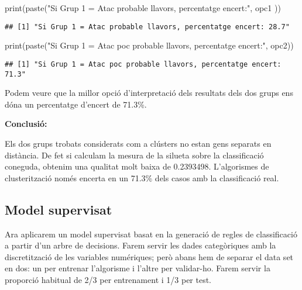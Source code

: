 \documentclass[
]{article}
\newenvironment{Shaded}{\begin{snugshade}}{\end{snugshade}}
\newcommand{\FunctionTok}[1]{\textcolor[rgb]{0.94,0.94,0.56}{#1}}
\newcommand{\NormalTok}[1]{\textcolor[rgb]{0.80,0.80,0.80}{#1}}
\newcommand{\StringTok}[1]{\textcolor[rgb]{0.80,0.58,0.58}{#1}}
\begin{document}
\begin{Shaded}
\begin{Highlighting}[]
\FunctionTok{print}\NormalTok{(}\FunctionTok{paste}\NormalTok{(}\StringTok{"Si Grup 1 = Atac probable llavors, percentatge encert:"}\NormalTok{, opc1 ))}
\end{Highlighting}
\end{Shaded}

\begin{verbatim}
## [1] "Si Grup 1 = Atac probable llavors, percentatge encert: 28.7"
\end{verbatim}

\begin{Shaded}
\begin{Highlighting}[]
\FunctionTok{print}\NormalTok{(}\FunctionTok{paste}\NormalTok{(}\StringTok{"Si Grup 1 = Atac poc probable llavors, percentatge encert:"}\NormalTok{, opc2))}
\end{Highlighting}
\end{Shaded}

\begin{verbatim}
## [1] "Si Grup 1 = Atac poc probable llavors, percentatge encert: 71.3"
\end{verbatim}

Podem veure que la millor opció d'interpretació dels resultats dels dos
grups ens dóna un percentatge d'encert de 71.3\%.

\textbf{Conclusió:}

Els dos grups trobats considerats com a clústers no estan gens separats
en distància. De fet si calculam la mesura de la silueta sobre la
classificació coneguda, obtenim una qualitat molt baixa de 0.2393498.
L'algorismes de clusterització només encerta en un 71.3\% dels casos amb
la classificació real.

\hypertarget{model-supervisat}{%
\subsection{Model supervisat}\label{model-supervisat}}

Ara aplicarem un model supervisat basat en la generació de regles de
classificació a partir d'un arbre de decisions. Farem servir les dades
categòriques amb la discretització de les variables numériques; però
abans hem de separar el data set en dos: un per entrenar l'algorisme i
l'altre per validar-ho. Farem servir la proporció habitual de 2/3 per
entrenament i 1/3 per test.
\end{document}
